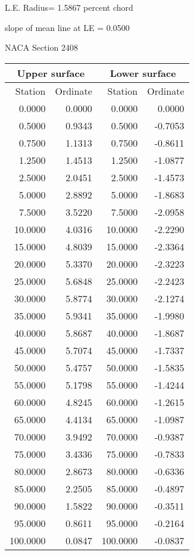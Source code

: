 \documentclass[11pt]{book}
\begin{document}
L.E. Radius=  1.5867 percent chord


 slope of mean line at LE =  0.0500
 \newpage
  \label{s2408}
 \begin{Large}
 NACA Section 2408
 \end{Large}
  
 \vspace{8mm}
 \begin{tabular}{|r|r|r|r|} \hline 
 \multicolumn{2}{|c|}{Upper surface} & \multicolumn{2}{|c|}{Lower surface} \\
 \hline
 Station & Ordinate & Station & Ordinate \\
 \hline
0.0000 & 0.0000 & 0.0000 & 0.0000 \\
0.5000 & 0.9343 & 0.5000 & -0.7053 \\
0.7500 & 1.1313 & 0.7500 & -0.8611 \\
1.2500 & 1.4513 & 1.2500 & -1.0877 \\
2.5000 & 2.0451 & 2.5000 & -1.4573 \\
5.0000 & 2.8892 & 5.0000 & -1.8683 \\
7.5000 & 3.5220 & 7.5000 & -2.0958 \\
10.0000 & 4.0316 & 10.0000 & -2.2290 \\
15.0000 & 4.8039 & 15.0000 & -2.3364 \\
20.0000 & 5.3370 & 20.0000 & -2.3223 \\
25.0000 & 5.6848 & 25.0000 & -2.2423 \\
30.0000 & 5.8774 & 30.0000 & -2.1274 \\
35.0000 & 5.9341 & 35.0000 & -1.9980 \\
40.0000 & 5.8687 & 40.0000 & -1.8687 \\
45.0000 & 5.7074 & 45.0000 & -1.7337 \\
50.0000 & 5.4757 & 50.0000 & -1.5835 \\
55.0000 & 5.1798 & 55.0000 & -1.4244 \\
60.0000 & 4.8245 & 60.0000 & -1.2615 \\
65.0000 & 4.4134 & 65.0000 & -1.0987 \\
70.0000 & 3.9492 & 70.0000 & -0.9387 \\
75.0000 & 3.4336 & 75.0000 & -0.7833 \\
80.0000 & 2.8673 & 80.0000 & -0.6336 \\
85.0000 & 2.2505 & 85.0000 & -0.4897 \\
90.0000 & 1.5822 & 90.0000 & -0.3511 \\
95.0000 & 0.8611 & 95.0000 & -0.2164 \\
100.0000 & 0.0847 & 100.0000 & -0.0837 \\
 \hline 
 \end{tabular}
\end{document}
